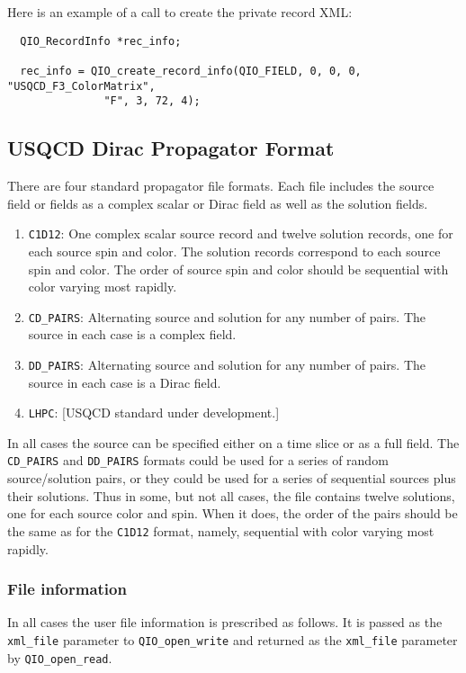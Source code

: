 \documentclass{article}
\begin{document}
Here is an example of a call to create the private record XML:

\begin{verbatim}
  QIO_RecordInfo *rec_info;

  rec_info = QIO_create_record_info(QIO_FIELD, 0, 0, 0, "USQCD_F3_ColorMatrix",
               "F", 3, 72, 4); 
\end{verbatim}


\subsection{USQCD Dirac Propagator Format}

There are four standard propagator file formats.  Each file includes
the source field or fields as a complex scalar or Dirac field as well
as the solution fields.
%
\begin{enumerate}
\item \verb|C1D12|: One complex scalar source record and twelve
  solution records, one for each source spin and color.  The solution
  records correspond to each source spin and color.  The order of
  source spin and color should be sequential with color varying most
  rapidly.
\item \verb|CD_PAIRS|: Alternating source and solution for any number
  of pairs.  The source in each case is a complex field.
\item \verb|DD_PAIRS|: Alternating source and solution for any number
  of pairs.  The source in each case is a Dirac field.
\item \verb|LHPC|: [USQCD standard under development.]
\end{enumerate}
%
In all cases the source can be specified either on a time slice or as
a full field.  The \verb|CD_PAIRS| and \verb|DD_PAIRS| formats could
be used for a series of random source/solution pairs, or they could be
used for a series of sequential sources plus their solutions.  Thus in
some, but not all cases, the file contains twelve solutions, one for
each source color and spin.  When it does, the order of the pairs
should be the same as for the \verb|C1D12| format, namely, sequential
with color varying most rapidly.

\subsubsection{File information}

In all cases the user file information is prescribed as follows.  It
is passed as the \verb|xml_file| parameter to \verb|QIO_open_write| and
returned as the \verb|xml_file| parameter by \verb|QIO_open_read|.
\end{document}
